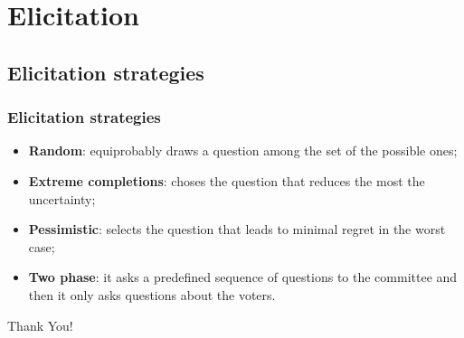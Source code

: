 \documentclass{beamer}
\begin{document}
\section{Elicitation}
	
	\subsection{Elicitation strategies}
	\begin{frame}
		\frametitle{Elicitation strategies}
		\begin{itemize}
			\item \textbf{Random}: equiprobably draws a question among the set of the possible ones;
			
			\item \textbf{Extreme completions}: choses the question that reduces the most the uncertainty;
			
			\item \textbf{Pessimistic}: selects the question that leads to minimal regret in the worst case; 
			
			\item \textbf{Two phase}: it asks a predefined sequence of questions to the committee and then it only asks questions about the voters.
		\end{itemize}
		\bigskip
	\end{frame}


\addtocounter{framenumber}{-1}
\begin{frame}[plain]
	\centering \color{darkred}\LARGE Thank You!
\end{frame}





 


\end{document}
